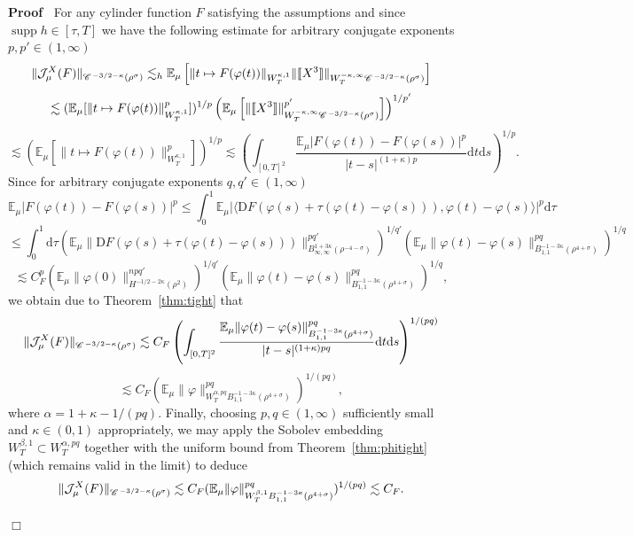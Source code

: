\documentclass[a4paper,11pt]{article}
\newcommand{\mathD}{\mathrm{D}}
\newcommand{\mathd}{\mathrm{d}}
\newcommand{\tmop}[1]{\ensuremath{\operatorname{#1}}}
\newenvironment{proof}{\noindent\textbf{Proof\ }}{\hspace*{\fill}$\Box$\medskip}
\numberwithin{equation}{section}
\newcommand{\CC}{\mathscr{C} \hspace{.1em}}
\begin{document}
\begin{proof}
  For any cylinder function $F$ satisfying the assumptions and since
  $\tmop{supp} h \in [\tau, T]$ we have the following estimate for arbitrary
  conjugate exponents $p, p' \in (1, \infty)$
  \[ \| \mathcal{J}^X_{\mu} (F) \|_{\CC^{- 3 / 2 - \kappa} (\rho^{\sigma})}
     \lesssim_h \mathbb{E}_{\mu} \left[ \| t \mapsto F (\varphi (t))
     \|_{W^{\kappa, 1}_T} \| \llbracket X^3 \rrbracket \|_{W^{- \kappa,
     \infty}_T \CC^{- 3 / 2 - \kappa} (\rho^{\sigma})} \right] \]
  \[ \lesssim (\mathbb{E}_{\mu} [\| t \mapsto F (\varphi (t)) \|_{W^{\kappa,
     1}_T}^p])^{1 / p}  \left( \mathbb{E}_{\mu} \left[ \| \llbracket X^3
     \rrbracket \|_{W^{- \kappa, \infty}_T \CC^{- 3 / 2 - \kappa}
     (\rho^{\sigma})}^{p'} \right] \right)^{1 / p'} \]
  \[ \lesssim (\mathbb{E}_{\mu} [\| t \mapsto F (\varphi (t)) \|_{W^{\kappa,
     1}_T}^p])^{1 / p} \lesssim \left( \int_{[0, T]^2} \frac{\mathbb{E}_{\mu}
     | F (\varphi (t)) - F (\varphi (s)) |^p}{| t - s |^{(1 + \kappa) p}}
     \mathd t \mathd s \right)^{1 / p} . \]
  Since for arbitrary conjugate exponents $q, q' \in (1, \infty)$
  \[ \mathbb{E}_{\mu} | F (\varphi (t)) - F (\varphi (s)) |^p \leqslant
     \int_0^1 \mathbb{E}_{\mu} | \langle \mathD F (\varphi (s) + \tau (\varphi
     (t) - \varphi (s))), \varphi (t) - \varphi (s) \rangle |^p \mathd \tau \]
  \[ \leqslant \int_0^1 \mathd \tau (\mathbb{E}_{\mu} \| \mathD F (\varphi (s)
     + \tau (\varphi (t) - \varphi (s))) \|^{p q'}_{B_{\infty, \infty}^{1 + 3
     \kappa} (\rho^{- 4 - \sigma})})^{1 / q'}  (\mathbb{E}_{\mu} \| \varphi
     (t) - \varphi (s) \|^{p q}_{B_{1, 1}^{- 1 - 3 \kappa} (\rho^{4 +
     \sigma})})^{1 / q} \]
  \[ \lesssim C^p_F (\mathbb{E}_{\mu} \| \varphi (0) \|_{H^{- 1 / 2 -2 \kappa}
     (\rho^2)}^{n p q'})^{1 / q'} (\mathbb{E}_{\mu} \| \varphi (t) - \varphi
     (s) \|^{p q}_{B_{1, 1}^{- 1 - 3 \kappa} (\rho^{4 + \sigma})})^{1 / q}, \]
  we obtain due to Theorem~\ref{thm:tight} that
  \[ \| \mathcal{J}^X_{\mu} (F) \|_{\CC^{- 3 / 2 - \kappa} (\rho^{\sigma})}
     \lesssim C_F \left( \int_{[0, T]^2} \frac{\mathbb{E}_{\mu} \| \varphi (t)
     - \varphi (s) \|^{p q}_{B_{1, 1}^{- 1 - 3 \kappa} (\rho^{4 +
     \sigma})}}{| t - s |^{(1 + \kappa) p q}} \mathd t \mathd s \right)^{1
     / (p q)} \]
  \[ \lesssim C_F (\mathbb{E}_{\mu} \| \varphi \|^{p q}_{W_T^{\alpha, p q}
     B_{1, 1}^{- 1 - 3 \kappa} (\rho^{4 + \sigma})})^{1 / (p q)}, \]
  where $\alpha = 1 + \kappa - 1 / (p q)$. Finally, choosing $p, q \in (1,
  \infty)$ sufficiently small and $\kappa \in (0, 1)$ appropriately, we may
  apply the Sobolev embedding $W_T^{\beta, 1} \subset W_T^{\alpha, p q}$
  together with the uniform bound from Theorem~\ref{thm:phitight} (which
  remains valid in the limit) to deduce
  \[ \| \mathcal{J}^X_{\mu} (F) \|_{\CC^{- 3 / 2 - \kappa} (\rho^{\sigma})}
     \lesssim C_F (\mathbb{E}_{\mu} \| \varphi \|^{p q}_{W_T^{\beta, 1} B_{1,
     1}^{- 1 - 3 \kappa} (\rho^{4 + \sigma})})^{1 / (p q)} \lesssim C_F . \]
  

\end{proof}
\end{document}
